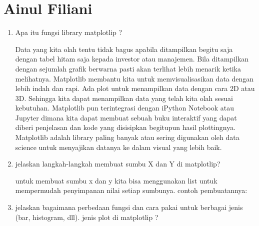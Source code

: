 \documentclass[10pt]{article}
\begin{document}
\section{Ainul Filiani}
\begin{enumerate}
\item Apa itu fungsi library matplotlip ?

Data yang kita olah tentu tidak bagus apabila ditampilkan begitu saja dengan tabel hitam saja kepada investor atau manajemen. Bila ditampilkan dengan sejumlah grafik berwarna pasti akan terlihat lebih menarik ketika melihatnya. Matplotlib membantu kita untuk memvisualisasikan data dengan lebih indah dan rapi.
Ada plot untuk menampilkan data dengan cara 2D atau 3D. Sehingga kita dapat menampilkan data yang telah kita olah sesuai kebutuhan. Matplotlib pun terintegrasi dengan iPython Notebook atau Jupyter dimana kita dapat membuat sebuah buku interaktif yang dapat diberi penjelasan dan kode yang disisipkan begitupun hasil plottingnya.
Matplotlib adalah library paling banyak atau sering digunakan oleh data science untuk menyajikan datanya ke dalam visual yang lebih baik.

\item jelaskan langkah-langkah membuat sumbu X dan Y di matplotlip?

untuk membuat sumbu x dan y kita bisa menggunakan list untuk mempermudah penyimpanan nilai setiap sumbunya.
contoh pembuatannya: 


\item jelaskan bagaimana perbedaan fungsi dan cara pakai untuk berbagai jenis (bar, histogram, dll). jenis plot di matplotlip ?  


\end{enumerate}
\end{document}
